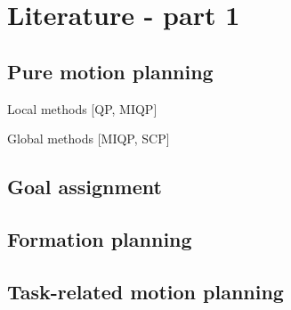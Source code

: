 
\section{Literature - part 1}\label{sec:3}

\subsection{Pure motion planning}
Local methods [QP, MIQP]

Global methods [MIQP, SCP]

\subsection{Goal assignment}


\subsection{Formation planning}


\subsection{Task-related motion planning}

